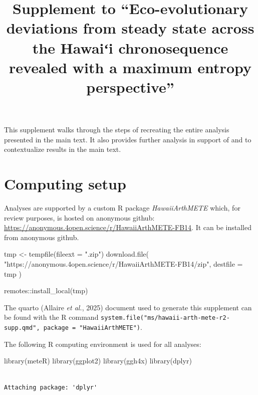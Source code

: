 \documentclass[
  letterpaper,
  DIV=11,
  numbers=noendperiod]{scrartcl}
\title{Supplement to ``Eco-evolutionary deviations from steady state
across the Hawaiʻi chronosequence revealed with a maximum entropy
perspective''}
\author{}
\date{}
\newenvironment{Shaded}{\begin{snugshade}}{\end{snugshade}}
\newcommand{\AttributeTok}[1]{\textcolor[rgb]{0.40,0.45,0.13}{#1}}
\newcommand{\FunctionTok}[1]{\textcolor[rgb]{0.28,0.35,0.67}{#1}}
\newcommand{\NormalTok}[1]{\textcolor[rgb]{0.00,0.23,0.31}{#1}}
\newcommand{\OtherTok}[1]{\textcolor[rgb]{0.00,0.23,0.31}{#1}}
\newcommand{\SpecialCharTok}[1]{\textcolor[rgb]{0.37,0.37,0.37}{#1}}
\newcommand{\StringTok}[1]{\textcolor[rgb]{0.13,0.47,0.30}{#1}}
\begin{document}
\maketitle


This supplement walks through the steps of recreating the entire
analysis presented in the main text. It also provides further analysis
in support of and to contextualize results in the main text.

\section{Computing setup}\label{sec-setup}

Analyses are supported by a custom R package \emph{HawaiiArthMETE}
which, for review purposes, is hosted on anonymous github:
\url{https://anonymous.4open.science/r/HawaiiArthMETE-FB14}. It can be
installed from anonymous github.

\begin{Shaded}
\begin{Highlighting}[]
\NormalTok{tmp }\OtherTok{\textless{}{-}} \FunctionTok{tempfile}\NormalTok{(}\AttributeTok{fileext =} \StringTok{".zip"}\NormalTok{)}
\FunctionTok{download.file}\NormalTok{(}
    \StringTok{"https://anonymous.4open.science/r/HawaiiArthMETE{-}FB14/zip"}\NormalTok{,}
    \AttributeTok{destfile =}\NormalTok{ tmp}
\NormalTok{)}

\NormalTok{remotes}\SpecialCharTok{::}\FunctionTok{install\_local}\NormalTok{(tmp)}
\end{Highlighting}
\end{Shaded}

The quarto (Allaire \emph{et al.}, 2025) document used to generate this
supplement can be found with the R command
\texttt{system.file("ms/hawaii-arth-mete-r2-supp.qmd",\ package\ =\ "HawaiiArthMETE")}.

The following R computing environment is used for all analyses:

\begin{Shaded}
\begin{Highlighting}[]
\FunctionTok{library}\NormalTok{(meteR)}
\FunctionTok{library}\NormalTok{(ggplot2)}
\FunctionTok{library}\NormalTok{(ggh4x)}
\FunctionTok{library}\NormalTok{(dplyr)}
\end{Highlighting}
\end{Shaded}

\begin{verbatim}

Attaching package: 'dplyr'
\end{verbatim}
\end{document}
